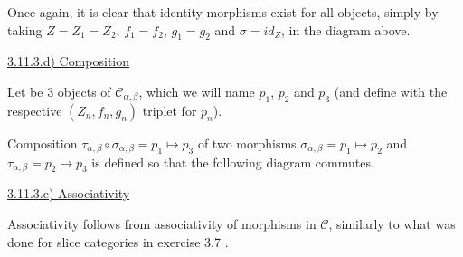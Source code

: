 Once again, it is clear that identity morphisms exist for all objects, simply by taking $Z = Z_1 = Z_2$, $f_1 = f_2$, $g_1 = g_2$ and $\sigma = id_Z$, in the diagram above.


\vspace{5mm}
\underline{3.11.3.d) Composition}

Let be 3 objects of $\mathcal{C}_{\alpha, \beta}$, which we will name $p_1$, $p_2$ and $p_3$ (and define with the respective $(Z_n, f_n, g_n)$ triplet for $p_n$).

Composition $\tau_{\alpha, \beta} \circ \sigma_{\alpha, \beta} = p_1 \mapsto p_3$ of two morphisms $\sigma_{\alpha, \beta} = p_1 \mapsto p_2$ and $\tau_{\alpha, \beta} = p_2 \mapsto p_3$ is defined so that the following diagram commutes.



\vspace{5mm}
\underline{3.11.3.e) Associativity}

Associativity follows from associativity of morphisms in $\mathcal{C}$, similarly to what was done for slice categories in exercise 3.7 .




